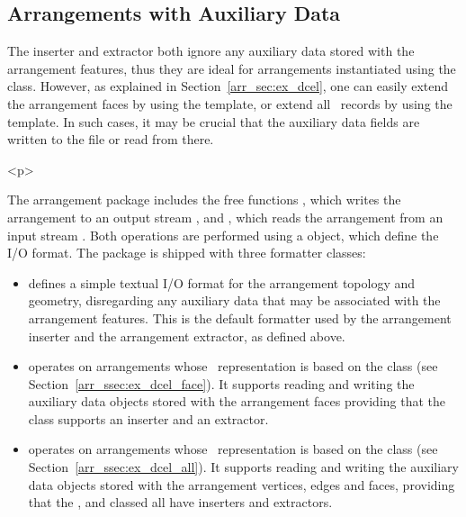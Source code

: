 \begin{ccAdvanced}
\subsection{Arrangements with Auxiliary Data}
\label{arr_ssec:arr_io_aux_data}
%
The inserter and extractor both ignore any auxiliary data stored with
the arrangement features, thus they are ideal for arrangements
instantiated using the  class.
However, as explained in Section~\ref{arr_sec:ex_dcel}, one can easily
extend the arrangement faces by using the 
template, or extend all \dcel\ records by using the 
template. In such cases, it may be crucial that the auxiliary data fields
are written to the file or read from there.

\begin{ccHtmlOnly}<p>\end{ccHtmlOnly}
The arrangement package includes the free functions
, which writes the arrangement 
to an output stream , and , which
reads the arrangement  from an input stream . Both
operations are performed using a  object, which define
the I/O format. The package is shipped with three formatter classes:
\begin{itemize}
\item {} defines a simple textual
I/O format for the arrangement topology and geometry, disregarding any
auxiliary data that may be associated with the arrangement features.
This is the default formatter used by the arrangement inserter and the
arrangement extractor, as defined above.
%
\item {} operates on
arrangements whose \dcel\ representation is based on the
 class (see
Section~\ref{arr_ssec:ex_dcel_face}). It supports reading and writing
the auxiliary data objects stored with the arrangement faces providing
that the  class supports an inserter and an extractor.
%
\item {} operates on
arrangements whose \dcel\ representation is based on the
 class
(see Section~\ref{arr_ssec:ex_dcel_all}). It supports reading and writing
the auxiliary data objects stored with the arrangement vertices, edges
and faces, providing that the ,  and
 classed all have inserters and extractors.
\end{itemize}


\end{ccAdvanced}
